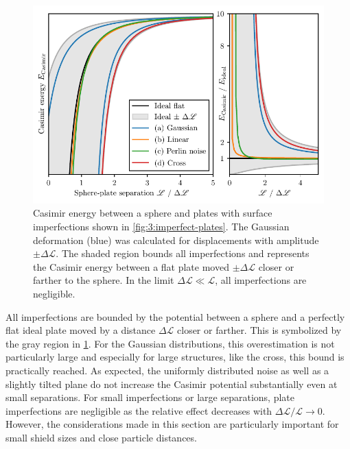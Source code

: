 \begin{figure}[!bp]
  \centering
  \includegraphics[width=\textwidth]{../figures/casimir/casimir-potential-imperfect-plates-relative.pdf}
  \caption{Casimir energy between a sphere and plates with surface imperfections shown in \cref{fig:3:imperfect-plates}. 
  The Gaussian deformation (blue) was calculated for displacements with amplitude $\pm\Delta\mathscr{L}$. The shaded region bounds all imperfections and represents the Casimir energy between a flat plate moved $\pm\Delta\mathscr{L}$ closer or farther to the sphere. In the limit $\Delta \mathscr{L} \ll \mathscr{L}$, all imperfections are negligible.}
  \label{fig:3:casimir-imperfect-plates}
\end{figure}
All imperfections are bounded by the potential between a sphere and a perfectly flat ideal plate moved by a distance $\Delta \mathscr{L}$ closer or farther.
This is symbolized by the gray region in \cref{fig:3:casimir-imperfect-plates}.
For the Gaussian distributions, this overestimation is not particularly large and especially for large structures, like the cross, this bound is practically reached.
As expected, the uniformly distributed noise as well as a slightly tilted plane do not increase the Casimir potential substantially even at small separations.
For small imperfections or large separations, plate imperfections are negligible as the relative effect decreases with $\Delta \mathscr{L}/\mathscr{L} \rightarrow 0$.
However, the considerations made in this section are particularly important for small shield sizes and close particle distances.